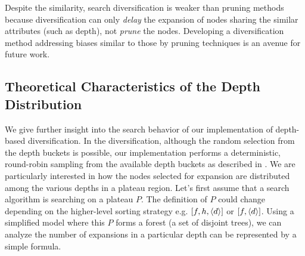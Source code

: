 Despite the similarity, search diversification is weaker than pruning methods because diversification can only \emph{delay} the expansion of nodes sharing the similar attributes (such as depth), not \emph{prune} the nodes.
Developing a diversification method addressing biases similar to those by pruning techniques is an avenue for future work.


\subsection{Theoretical Characteristics of the Depth Distribution}
\label{sec:theoretical-characteristics}

We give further insight into the search behavior of our implementation of depth-based diversification.
In the diversification, although the random selection from the depth buckets is possible,
our implementation performs a deterministic, round-robin sampling from the available depth buckets as described in .
% 
We are particularly interested in how the nodes selected for expansion are distributed 
among the various depths in a plateau region.
Let's first assume that a search algorithm is searching on a plateau $P$.
The definition of $P$ could change depending on the higher-level sorting strategy e.g. $[f,h,{\left<d\right>}]$ or $[f,{\left<d\right>}]$.
% 
Using a simplified model where this $P$ forms a forest (a set of disjoint trees),
we can analyze the number of expansions in a particular depth
can be represented by a simple formula. 




